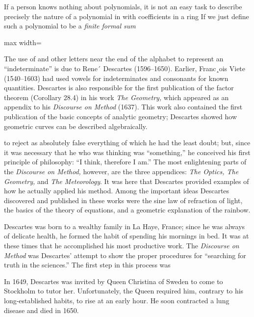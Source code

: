 \documentclass[11pt,oneside]{article}
\begin{document}
\begin{BookBody}
If a person knows nothing about polynomials, it is not an easy task to describe precisely the nature of a polynomial in  with coefficients in a ring  If we just define such a polynomial to be a\textit{ finite formal sum}

\begin{center}\begin{adjustbox}{max width=\linewidth}\end{adjustbox}\end{center}


\noindent The use of  and other letters near the end of the alphabet to represent an “indeterminate” is due to Rene´ Descartes (1596–1650). Earlier, Franc¸ois Viete (1540–1603) had used vowels for indeterminates and consonants for known quantities. Descartes is also responsible for the first publication of the factor theorem (Corollary 28.4) in his work\textit{ The Geometry,} which appeared as an appendix to his\textit{ Discourse on Method} (1637). This work also contained the first publication of the basic concepts of analytic geometry; Descartes showed how geometric curves can be described algebraically.

to reject as absolutely false everything of which he had the least doubt; but, since it was necessary that he who was thinking was “something,” he conceived his first principle of philosophy: “I think, therefore I am.” The most enlightening parts of the\textit{ Discourse on Method,} however, are the three appendices:\textit{ The Optics, The Geometry,} and\textit{ The Meteorology}. It was here that Descartes provided examples of how he actually applied his method. Among the important ideas Descartes discovered and published in these works were the sine law of refraction of light, the basics of the theory of equations, and a geometric explanation of the rainbow.

\noindent Descartes was born to a wealthy family in La Haye, France; since he was always of delicate health, he formed the habit of spending his mornings in bed. It was at these times that he accomplished his most productive work. The\textit{ Dis}\textit{course on Method} was Descartes’ attempt to show the proper procedures for “searching for truth in the sciences.” The first step in this process was

In 1649, Descartes was invited by Queen Christina of Sweden to come to Stockholm to tutor her. Unfortunately, the Queen required him, contrary to his long-established habits, to rise at an early hour. He soon contracted a lung disease and died in 1650.

\end{BookBody}
\end{document}
